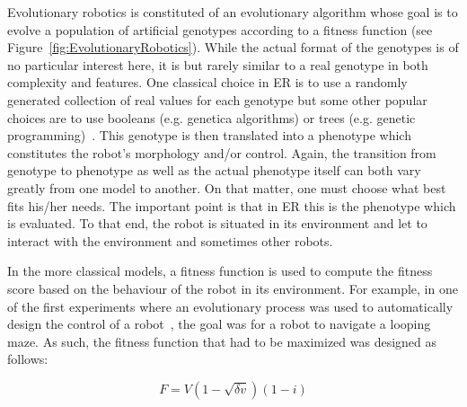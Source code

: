     Evolutionary robotics is constituted of an evolutionary algorithm whose goal is to evolve a population of artificial genotypes according to a fitness function (see Figure~\ref{fig:EvolutionaryRobotics}). While the actual format of the genotypes is of no particular interest here, it is but rarely similar to a real genotype in both complexity and features. One classical choice in ER is to use a randomly generated collection of real values for each genotype but some other popular choices are to use booleans (e.g. genetica algorithms) or trees (e.g. genetic programming)~\parencite{Eiben2015}. This genotype is then translated into a phenotype which constitutes the robot's morphology and/or control. Again, the transition from genotype to phenotype as well as the actual phenotype itself can both vary greatly from one model to another. On that matter, one must choose what best fits his/her needs. The important point is that in ER this is the phenotype which is evaluated. To that end, the robot is situated in its environment and let to interact with the environment and sometimes other robots. 

    
    In the more classical models, a fitness function is used to compute the fitness score based on the behaviour of the robot in its environment. For example, in one of the first experiments where an evolutionary process was used to automatically design the control of a robot~\parencite{Floreano1994}, the goal was for a robot to navigate a looping maze. As such, the fitness function that had to be maximized was designed as follows:

    \[
      F = V(1-\sqrt{\delta v})(1-i)
    \]

